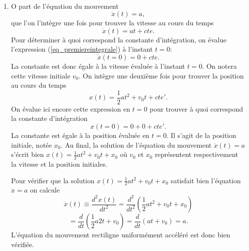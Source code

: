 %
%
\\[-3mm]
\begin{enumerate}
\item
O part de l'\'equation du mouvement
\[
\ddot{x}(t) =  a,
\] 
que l'on l'int\`egre une fois pour trouver la vitesse au cours du temps
\begin{equation}
\dot{x}(t) = at + cte.
\label{eq_premiereintegrale}
\end{equation}
Pour d\'eterminer \`a quoi correspond la constante d'int\'egration, on \'evalue l'expression (\ref{eq_premiereintegrale}) \`a l'instant $t=0$:
\[
\dot{x}(t=0) = 0 + cte. 
\]
La constante est donc \'egale \`a la vitesse \'evalu\'ee \`a l'instant $t=0$. On notera cette vitesse initiale $v_0$. 
On int\`egre une deuxi\`eme fois pour trouver la position au cours du temps
\begin{equation}
x(t) = \frac{1}{2}at^2 + v_0 t + cte'.
\label{eq_deuxiemeintegrale}
\end{equation}
On \'evalue ici encore cette expression en $t=0$ pour trouver \`a quoi correspond la constante d'int\'egration
\[
x(t=0) = 0 + 0 + cte'.
\]
La constante est \'egale \`a la position \'evalu\'ee en $t=0$. Il s'agit de la position initiale, not\'ee $x_0$.
Au final, la solution de l'\'equation du mouvement $\ddot{x}(t) =  a$ s'\'ecrit bien $x(t) = \frac{1}{2}at^2 + v_0 t + x_0$ o\`u $v_0$ et $x_0$ repr\'esentent respectivement la vitesse et la position initiales.

Pour v\'erifier que la solution $x(t)=\frac{1}{2}at^2+v_0t+x_0$ satisfait bien l'\'equation $\ddot{x}=a$ on calcule
\[
\ddot{x}(t) \equiv \frac{d^2x(t)}{dt^2} = \frac{d^2}{dt^2}\left(\frac{1}{2}at^2+v_0t+x_0\right)
\]
\[
= \frac{d}{dt}\left(\frac{1}{2}a2t+v_0\right) = \frac{d}{dt}\left(at+v_0\right) = a.  
\]
L'\'equation du mouvement rectiligne uniform\'ement acc\'el\'er\'e est donc bien v\'erifi\'ee.


\end{enumerate}
